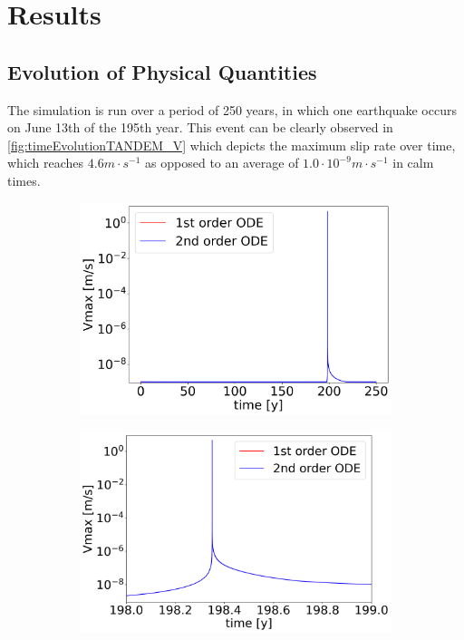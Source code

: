 \chapter{Results}
\section{Evolution of Physical Quantities}
The simulation is run over a period of 250 years, in which one earthquake occurs on June 13th of the 195th year. This event can be clearly observed in \autoref{fig:timeEvolutionTANDEM_V} which depicts the maximum slip rate over time, which reaches $4.6m\cdot s^{-1}$ as opposed to an average of $1.0 \cdot 10^{-9}m\cdot s^{-1}$ in calm times. 
\begin{figure}[H]
    \centering
    \begin{subfigure}{0.32\textwidth}
     	\centering
    	\includegraphics[width=1\textwidth]{images/TANDEMcompareFormulationstimeEvolutionVall.png}
    \end{subfigure} 
    \begin{subfigure}{0.32\textwidth}
    	\centering
    	\includegraphics[width=1\textwidth]{images/TANDEMcompareFormulationstimeEvolutionVsurroundings.png}

\end{subfigure}
\end{figure}
